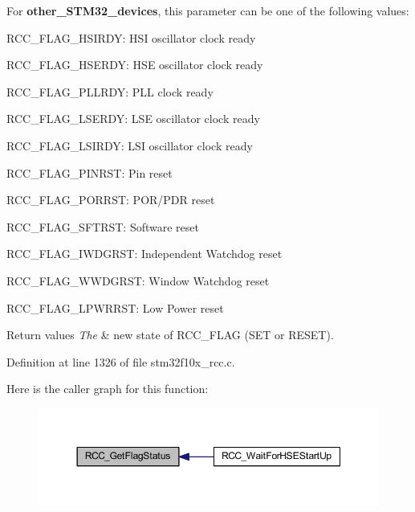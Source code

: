 For {\bfseries other\+\_\+\+S\+T\+M32\+\_\+devices}, this parameter can be one of the following values\+: \begin{DoxyItemize}
\item R\+C\+C\+\_\+\+F\+L\+A\+G\+\_\+\+H\+S\+I\+R\+DY\+: H\+SI oscillator clock ready \item R\+C\+C\+\_\+\+F\+L\+A\+G\+\_\+\+H\+S\+E\+R\+DY\+: H\+SE oscillator clock ready \item R\+C\+C\+\_\+\+F\+L\+A\+G\+\_\+\+P\+L\+L\+R\+DY\+: P\+LL clock ready \item R\+C\+C\+\_\+\+F\+L\+A\+G\+\_\+\+L\+S\+E\+R\+DY\+: L\+SE oscillator clock ready \item R\+C\+C\+\_\+\+F\+L\+A\+G\+\_\+\+L\+S\+I\+R\+DY\+: L\+SI oscillator clock ready \item R\+C\+C\+\_\+\+F\+L\+A\+G\+\_\+\+P\+I\+N\+R\+ST\+: Pin reset \item R\+C\+C\+\_\+\+F\+L\+A\+G\+\_\+\+P\+O\+R\+R\+ST\+: P\+O\+R/\+P\+DR reset \item R\+C\+C\+\_\+\+F\+L\+A\+G\+\_\+\+S\+F\+T\+R\+ST\+: Software reset \item R\+C\+C\+\_\+\+F\+L\+A\+G\+\_\+\+I\+W\+D\+G\+R\+ST\+: Independent Watchdog reset \item R\+C\+C\+\_\+\+F\+L\+A\+G\+\_\+\+W\+W\+D\+G\+R\+ST\+: Window Watchdog reset \item R\+C\+C\+\_\+\+F\+L\+A\+G\+\_\+\+L\+P\+W\+R\+R\+ST\+: Low Power reset\end{DoxyItemize}

\begin{DoxyRetVals}{Return values}
{\em The} & new state of R\+C\+C\+\_\+\+F\+L\+AG (S\+ET or R\+E\+S\+ET). \\
\hline
\end{DoxyRetVals}


Definition at line 1326 of file stm32f10x\+\_\+rcc.\+c.

Here is the caller graph for this function\+:
\nopagebreak
\begin{figure}[H]
\begin{center}
\leavevmode
\includegraphics[width=350pt]{group___r_c_c___exported___functions_ga2897bdc52f272031c44fb1f72205d295_icgraph}
\end{center}
\end{figure}
\mbox{\label{group___r_c_c___exported___functions_ga6126c99f398ee4be410ad76ae3aee18f}} 

